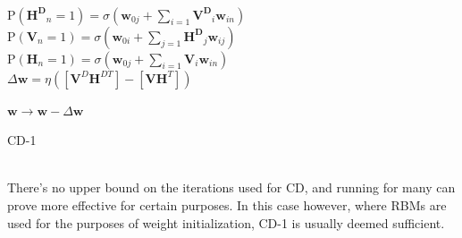 \documentclass[a4paper,11pt,oneside]{article}
\theoremstyle{plain}
\theoremstyle{definition}
\begin{document}
	
	\begin{algorithm}[H]
		
		\texttt{}\newline
		
		{
			~\\
			{
				$\mathrm{P}(\mathbf{H^D}_n=1) = \sigma(\mathbf{w}_{0j} +  \sum_{i=1}\mathbf{V^D}_i\mathbf{w}_{in})$
			}
			~\\
			{
				$\mathrm{P}(\mathbf{V}_n=1) = \sigma(\mathbf{w}_{0i} + \sum_{j=1}\mathbf{H^D}_j\mathbf{w}_{ij})$
			}
			~\\

			{
				$\mathrm{P}(\mathbf{H}_n=1) = \sigma(\mathbf{w}_{0j} +  \sum_{i=1}\mathbf{V}_i\mathbf{w}_{in})$
			}
			~\\

			$\Delta \mathbf{w} = \eta ([{\mathbf{V}^D}{\mathbf{H}^{DT}}] - [\mathbf{V}\mathbf{H}^T])$

			\texttt{}\newline
			
			$\mathbf{w} \rightarrow \mathbf{w} - \Delta \mathbf{w}$
		}

		
		
		\label{algo_cd1}
		\caption{CD-1}
	\end{algorithm}
	~\\
	There's no upper bound on the iterations used for CD, and running for many can prove more effective for certain purposes. In this case however, where RBMs are used for the purposes of weight initialization, CD-1 is usually deemed sufficient.
	
\end{document}
